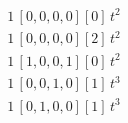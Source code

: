 \begin{align*}
1\,[0,0,0,0] [0]\,t^{2} \\
1\,[0,0,0,0] [2]\,t^{2} \\
1\,[1,0,0,1] [0]\,t^{2} \\
1\,[0,0,1,0] [1]\,t^{3} \\
1\,[0,1,0,0] [1]\,t^{3}
\end{align*}
